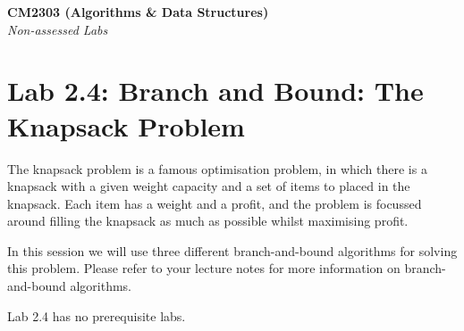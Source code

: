\documentclass[11pt,a4paper]{report}
\begin{document}
\noindent\Large\textbf{CM2303 (Algorithms \& Data Structures)}\\
\noindent\large\textit{Non-assessed Labs}
\vskip30pt

\section*{Lab 2.4: Branch and Bound: The Knapsack Problem}

The knapsack problem is a famous optimisation problem, in which there is a knapsack with a given weight capacity and a set of items to placed in the knapsack. Each item has a weight and a profit, and the problem is focussed around filling the knapsack as much as possible whilst maximising profit.

In this session we will use three different branch-and-bound algorithms for solving this problem. Please refer to your lecture notes for more information on branch-and-bound algorithms.

Lab 2.4 has no prerequisite labs.
\end{document}
